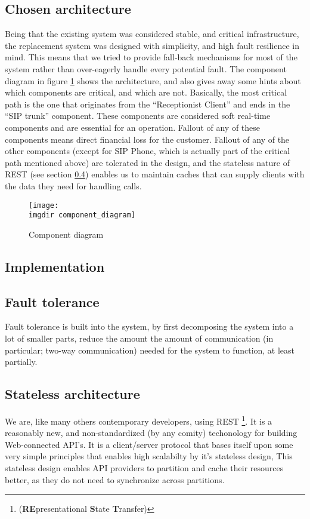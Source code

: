 \subsection{Chosen architecture}
Being that the existing system was considered stable, and critical infrastructure, the replacement system was designed with simplicity, and high fault resilience in mind. This means that we tried to provide fall-back mechanisms for most of the system rather than over-eagerly handle every potential fault. The component diagram in figure \ref{fig:component_diagram} shows the architecture, and also gives away some hints about which components are critical, and which are not. Basically, the most critical path is the one that originates from the ``Receptionist Client'' and ends in the ``SIP trunk'' component. These components are considered soft real-time components and are essential for an operation. Fallout of any of these components means direct financial loss for the customer. Fallout of any of the other components (except for SIP Phone, which is actually part of the critical path mentioned above) are tolerated in the design, and the stateless nature of REST (see section \ref{sec:rest}) enables us to maintain caches that can supply clients with the data they need for handling calls.

\begin{figure}[ht]
\centering
\texttt{[image: \\imgdir component\_diagram]}
\caption{Component diagram}
\label{fig:component_diagram}
\end{figure}

\subsection{Implementation}
\subsection{Fault tolerance}
Fault tolerance is built into the system, by first decomposing the system into a lot of smaller parts, reduce the amount the amount of communication (in particular; two-way communication) needed for the system to function, at least partially.

\subsection{Stateless architecture}
\label{sec:rest}
We are, like many others contemporary developers, using REST \footnote{(\textbf{RE}presentational \textbf{S}tate \textbf{T}ransfer)}. It is a reasonably new, and non-standardized (by any comity) techonology for building Web-connected API's. It is a client/server protocol that bases itself upon some very simple principles that enables high scalabilty by it's stateless design, This stateless design enables API providers to partition and cache their resources better, as they do not need to synchronize across partitions.\smallskip

